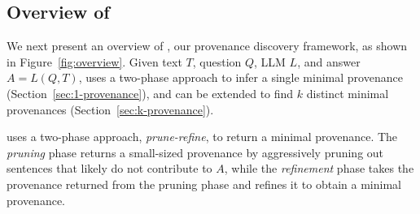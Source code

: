 \vspace{-3.5mm}
\subsection{Overview of \sys} 
\vspace{-1mm}
\label{subsec:overview}


We next present an overview of \sys, our
provenance discovery framework, as shown in  Figure~\ref{fig:overview}. 
Given text $T$, question $Q$, LLM $L$, and
answer $A = L(Q,T)$, 
\sys uses a two-phase approach to infer a single minimal provenance (Section~\ref{sec:1-provenance}),
and can be extended to find $k$ distinct minimal provenances  (Section~\ref{sec:k-provenance}). 


\sys uses a two-phase approach, 
{\em prune-refine}, 
to return a minimal provenance. 
The {\em pruning} phase returns a small-sized provenance by aggressively pruning out sentences 
that likely do not contribute to $A$, 
while the {\em refinement} phase 
takes the provenance 
returned from the pruning phase 
and refines it to obtain a minimal provenance. 

